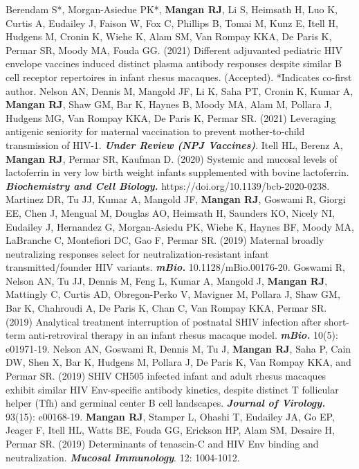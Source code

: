 \documentclass[letterpaper,MMMyyyy,nonstopmode]{simpleresumecv}
\begin{document}
\begin{Body}
\begingroup
\renewcommand{\MaxNumberedItem}{[88]}
\BigGap
Berendam S*, Morgan-Asiedue PK*, \textbf{Mangan RJ}, Li S, Heimsath H, Luo K, Curtis A, Eudailey J, Faison W, Fox C, Phillips B, Tomai M, Kunz E, Itell H, Hudgens M, Cronin K, Wiehe K, Alam SM, Van Rompay KKA, De Paris K, Permar SR, Moody MA, Fouda GG. (2021)  Different adjuvanted pediatric HIV envelope vaccines induced distinct plasma antibody responses despite similar B cell receptor repertoires in infant rhesus macaques. \textbf{} (Accepted). *Indicates co-first author.
\Gap
Nelson AN, Dennis M, Mangold JF, Li K, Saha PT, Cronin K, Kumar A, \textbf{Mangan RJ}, Shaw GM, Bar K, Haynes B, Moody MA, Alam M, Pollara J, Hudgens MG, Van Rompay KKA, De Paris K, Permar SR. (2021) Leveraging antigenic seniority for maternal vaccination to prevent mother-to-child transmission of HIV-1. \textbf{\textit{Under Review (NPJ Vaccines)}}.
\Gap
\Gap
Itell HL, Berenz A, \textbf{Mangan RJ}, Permar SR, Kaufman D. (2020) Systemic and mucosal levels of lactoferrin in very low birth weight infants supplemented with bovine lactoferrin. \textbf{\textit{Biochemistry and Cell Biology.}} https://doi.org/10.1139/bcb-2020-0238.
\Gap
Martinez DR, Tu JJ, Kumar A, Mangold JF, \textbf{Mangan RJ}, Goswami R, Giorgi EE, Chen J, Mengual M, Douglas AO, Heimsath H, Saunders KO, Nicely NI, Eudailey J, Hernandez G, Morgan-Asiedu PK, Wiehe K, Haynes BF, Moody MA, LaBranche C, Montefiori DC, Gao F, Permar SR. (2019) Maternal broadly neutralizing responses select for neutralization-resistant infant transmitted/founder HIV variants. \textbf{\textit{mBio.}} 10.1128/mBio.00176-20.
\Gap
Goswami R, Nelson AN, Tu JJ, Dennis M, Feng L, Kumar A, Mangold J, \textbf{Mangan RJ}, Mattingly C, Curtis AD, Obregon-Perko V, Mavigner M, Pollara J, Shaw GM, Bar K, Chahroudi A, De Paris K, Chan C, Van Rompay KKA, Permar SR. (2019) Analytical treatment interruption of postnatal SHIV infection after short-term anti-retroviral therapy in an infant rhesus macaque model. \textbf{\textit{mBio.}} 10(5): e01971-19.
\Gap
Nelson AN, Goswami R, Dennis M, Tu J, \textbf{Mangan RJ}, Saha P, Cain DW, Shen X, Bar K, Hudgens M, Pollara J, De Paris K, Van Rompay KKA, and Permar SR. (2019) SHIV CH505 infected infant and adult rhesus macaques exhibit similar HIV Env-specific antibody kinetics, despite distinct T follicular helper (Tfh) and germinal center B cell landscapes. \textbf{\textit{Journal of Virology.}} 93(15): e00168-19.
\Gap
\textbf{Mangan RJ}, Stamper L, Ohashi T, Eudailey JA, Go EP, Jeager F, Itell HL, Watts BE, Fouda GG, Erickson HP, Alam SM, Desaire H, Permar SR. (2019) Determinants of tenascin-C and HIV Env binding and neutralization. \textbf{\textit{Mucosal Immunology}}. 12: 1004-1012.

\end{Body}
\end{document}
